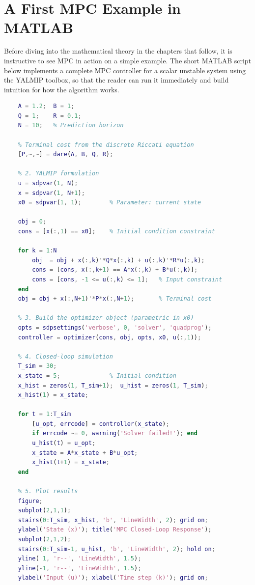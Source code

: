\section{A First MPC Example in MATLAB}

Before diving into the mathematical theory in the chapters that follow, it is instructive to see MPC in action on a simple example. The short MATLAB script below implements a complete MPC controller for a scalar unstable system using the YALMIP toolbox, so that the reader can run it immediately and build intuition for how the algorithm works.

\begin{lstlisting}[language=Matlab, caption={A minimal MPC example for a scalar unstable system.}, label={lst:first_mpc}]
	% 1. Define the scalar unstable system: x_{k+1} = 1.2*x_k + u_k
	A = 1.2;  B = 1;
	Q = 1;    R = 0.1;
	N = 10;   % Prediction horizon

	% Terminal cost from the discrete Riccati equation
	[P,~,~] = dare(A, B, Q, R);

	% 2. YALMIP formulation
	u = sdpvar(1, N);
	x = sdpvar(1, N+1);
	x0 = sdpvar(1, 1);        % Parameter: current state

	obj = 0;
	cons = [x(:,1) == x0];    % Initial condition constraint

	for k = 1:N
		obj  = obj + x(:,k)'*Q*x(:,k) + u(:,k)'*R*u(:,k);
		cons = [cons, x(:,k+1) == A*x(:,k) + B*u(:,k)];
		cons = [cons, -1 <= u(:,k) <= 1];   % Input constraint
	end
	obj = obj + x(:,N+1)'*P*x(:,N+1);       % Terminal cost

	% 3. Build the optimizer object (parametric in x0)
	opts = sdpsettings('verbose', 0, 'solver', 'quadprog');
	controller = optimizer(cons, obj, opts, x0, u(:,1));

	% 4. Closed-loop simulation
	T_sim = 30;
	x_state = 5;              % Initial condition
	x_hist = zeros(1, T_sim+1);  u_hist = zeros(1, T_sim);
	x_hist(1) = x_state;

	for t = 1:T_sim
		[u_opt, errcode] = controller(x_state);
		if errcode ~= 0, warning('Solver failed!'); end
		u_hist(t) = u_opt;
		x_state = A*x_state + B*u_opt;
		x_hist(t+1) = x_state;
	end

	% 5. Plot results
	figure;
	subplot(2,1,1);
	stairs(0:T_sim, x_hist, 'b', 'LineWidth', 2); grid on;
	ylabel('State (x)'); title('MPC Closed-Loop Response');
	subplot(2,1,2);
	stairs(0:T_sim-1, u_hist, 'b', 'LineWidth', 2); hold on;
	yline( 1, 'r--', 'LineWidth', 1.5);
	yline(-1, 'r--', 'LineWidth', 1.5);
	ylabel('Input (u)'); xlabel('Time step (k)'); grid on;
\end{lstlisting}

